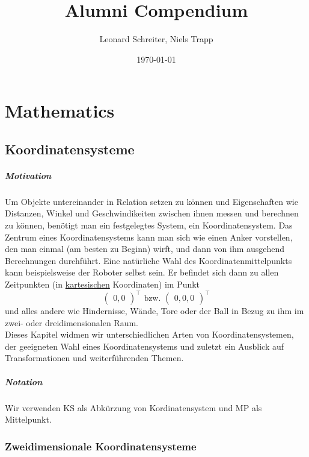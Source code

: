 \documentclass[12pt,a4paper]{report}
\title{Alumni Compendium}           %
\author{Leonard Schreiter, Niels Trapp}          %
\date{\today}           %
\begin{document}
	\maketitle

	\tableofcontents

	\chapter{Mathematics}
	 \section{Koordinatensysteme}
	  \paragraph{Motivation}

		  Um Objekte untereinander in Relation setzen zu können und Eigenschaften wie Distanzen, Winkel und Geschwindikeiten zwischen ihnen messen und berechnen zu können, benötigt man ein festgelegtes System, ein Koordinatensystem.
		  Das Zentrum eines Koordinatensystems kann man sich wie einen Anker vorstellen, den man einmal (am besten zu Beginn) wirft, und dann von ihm ausgehend Berechnungen durchführt.
		  Eine natürliche Wahl des Koordinatenmittelpunkts kann beispielsweise der Roboter selbst sein.
		  Er befindet sich dann zu allen Zeitpunkten (in \hyperref[Mathe_KS_kartesisch]{kartesischen} Koordinaten) im Punkt
		  \begin{equation*} \begin{pmatrix}0,0\end{pmatrix}^\top \text{ bzw. }\begin{pmatrix}0,0,0\end{pmatrix}^\top \end{equation*}
		  und alles andere wie Hindernisse, Wände, Tore oder der Ball in Bezug zu ihm im zwei- oder dreidimensionalen Raum. \\
		  Dieses Kapitel widmen wir unterschiedlichen Arten von Koordinatensystemen, der geeigneten Wahl eines Koordinatensystems und zuletzt ein Ausblick auf Transformationen und weiterführenden Themen.

	  \paragraph{Notation}
		  Wir verwenden KS als Abkürzung von Kordinatensystem und MP als Mittelpunkt.

	  \subsection{Zweidimensionale Koordinatensysteme}
\end{document}
